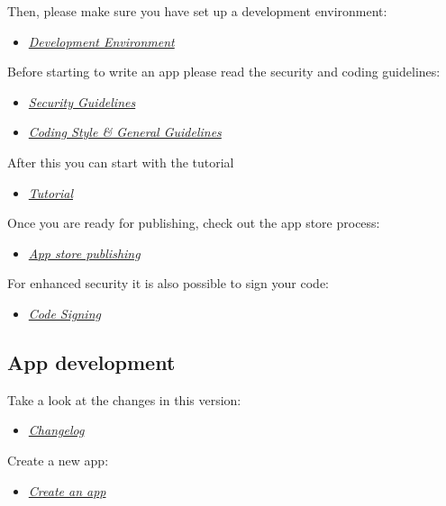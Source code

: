 \documentclass[letterpaper,10pt,english]{sphinxmanual}
\begin{document}
Then, please make sure you have set up a development environment:
\begin{itemize}
\item {} 
{\hyperref[general/devenv::doc]{\emph{Development Environment}}}

\end{itemize}

Before starting to write an app please read the security and coding guidelines:
\begin{itemize}
\item {} 
{\hyperref[general/security::doc]{\emph{Security Guidelines}}}

\item {} 
{\hyperref[general/codingguidelines::doc]{\emph{Coding Style \& General Guidelines}}}

\end{itemize}

After this you can start with the tutorial
\begin{itemize}
\item {} 
{\hyperref[app/tutorial::doc]{\emph{Tutorial}}}

\end{itemize}

Once you are ready for publishing, check out the app store process:
\begin{itemize}
\item {} 
{\hyperref[app/publishing::doc]{\emph{App store publishing}}}

\end{itemize}

For enhanced security it is also possible to sign your code:
\begin{itemize}
\item {} 
{\hyperref[app/code_signing::doc]{\emph{Code Signing}}}

\end{itemize}


\subsection{App development}
\label{app/index:id1}
Take a look at the changes in this version:
\begin{itemize}
\item {} 
{\hyperref[app/changelog::doc]{\emph{Changelog}}}

\end{itemize}

Create a new app:
\begin{itemize}
\item {} 
{\hyperref[app/startapp::doc]{\emph{Create an app}}}

\end{itemize}
\end{document}
